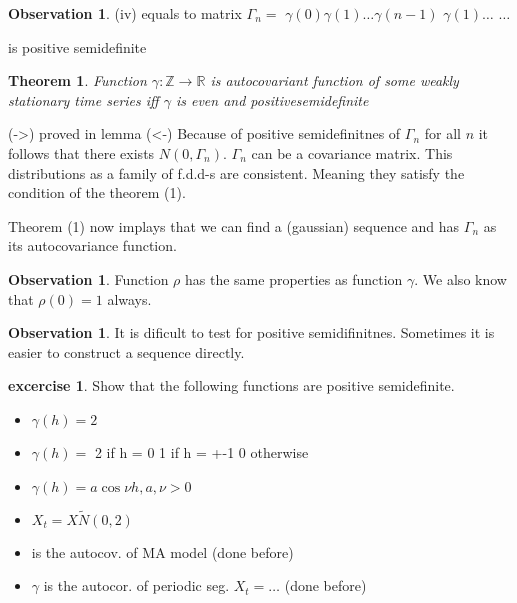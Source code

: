 \documentclass[12pt,a4paper]{amsart}
\theoremstyle{definition} %
\newtheorem{excercise}[defn]{excercise}
\newtheorem{observation}[defn]{Observation}
\theoremstyle{plain} %
\newtheorem{theorem}[defn]{Theorem}
\newcommand{\R}{\mathbb R}
\newcommand{\Z}{\mathbb Z}
\begin{document}
\begin{observation}
(iv) equals to 
matrix $\Gamma_n = $
$\gamma(0) \gamma(1) \dots \gamma(n-1)$
$\gamma(1)\dots$
$\dots$

is positive semidefinite
\end{observation}


\begin{theorem}
Function $\gamma: \Z \rightarrow \R$ is autocovariant function of some weakly stationary time series 
iff
$\gamma$ is even and positivesemidefinite
\end{theorem}


\proof
(->) proved in lemma
(<-) Because of positive semidefinitnes of $\Gamma_n$ for all $n$ it follows that there exists $N(0, \Gamma_n)$. $\Gamma_n$ can be a covariance matrix. This distributions as a family of f.d.d-s are consistent. Meaning they satisfy the condition of the theorem 
 (1).

Theorem (1) now implays that we can find a (gaussian) sequence and has $\Gamma_n$ as its autocovariance function.

\endproof

\begin{observation}
Function $\rho$ has the same properties as function $\gamma$. We also know that $\rho(0) = 1$ always.
\end{observation}

\begin{observation}
It is dificult to test for positive semidifinitnes. Sometimes it is easier to construct a sequence directly.
\end{observation}

\begin{excercise}
Show that the following functions are positive semidefinite.
\begin{itemize}
\item $\gamma(h) = 2$
\item $\gamma(h) =$ 2 if h = 0 1 if h = +-1 0 otherwise
\item $\gamma(h) = a \cos{\nu h}, a, \nu > 0$
\end{itemize}
\begin{itemize}
\item $X_t = X \tilde N(0,2)$
\item is the autocov. of MA model (done before)
\item $\gamma$ is the autocor. of periodic seg. $X_t = \dots$ (done before)
\end{itemize}


\end{excercise}
\end{document}
